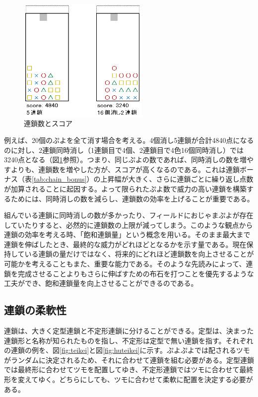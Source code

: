 \documentclass[12pt]{jarticle}
\begin{document}
\begin{figure}[hbt]
  \begin{center}
  \includegraphics[height=6cm]{img/chain_score.png}
  \caption{連鎖数とスコア} \label{fig:chain_score}
\end{center}
\end{figure}

例えば、20個のぷよを全て消す場合を考える。4個消し5連鎖が合計4840点になるのに対し、2連鎖同時消し（1連鎖目で4個、2連鎖目で4色16個同時消し）では3240点となる（図\ref{fig:chain_score}参照）。つまり、同じぷよの数であれば、同時消しの数を増やすよりも、連鎖数を増やした方が、スコアが高くなるのである。これは連鎖ボーナス（表\ref{tab:chain_bonus}）の上昇幅が大きく、さらに連鎖ごとに繰り返し点数が加算されることに起因する。よって限られたぷよ数で威力の高い連鎖を構築するためには、同時消しの数を減らし、連鎖数の効率を上げることが重要である。

組んでいる連鎖に同時消しの数が多かったり、フィールドにおじゃまぷよが存在していたりすると、必然的に連鎖数の上限が減ってしまう。このような観点から連鎖の効率を考える時、「飽和連鎖量」という概念を用いる。そのまま最大まで連鎖を伸ばしたとき、最終的な威力がどれほどとなるかを示す量である。現在保持している連鎖の量だけではなく、将来的にどれほど連鎖数を向上させることが可能かを考えることもまた、重要な能力である。そのような先読みによって、連鎖を完成させることよりもさらに伸ばすための布石を打つことを優先するような工夫ができ、飽和連鎖量を向上させることができるのである。

\subsection{連鎖の柔軟性}
連鎖は、大きく定型連鎖と不定形連鎖に分けることができる。定型は、決まった連鎖形と名称が知られたものを指し、不定形は定型で無い連鎖を指す。それぞれの連鎖の例を、図\ref{fig:teikei}と図\ref{fig:huteikei}に示す。ぷよぷよでは配されるツモがランダムに決定されるため、それに合わせて連鎖を組む必要がある。定型連鎖では最終形に合わせてツモを配置してゆき、不定形連鎖ではツモに合わせて最終形を変えてゆく。どちらにしても、ツモに合わせて柔軟に配置を決定する必要がある。
\end{document}
